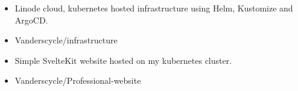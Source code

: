 \documentclass[10pt,a4paper,ragged2e,withhyper]{altacv}
\begin{document}
\begin{paracol}{2}

\begin{itemize}
\item Linode cloud, kubernetes hosted infrastructure using Helm, Kustomize and
  ArgoCD.
\item \faGithub Vanderscycle/infrastructure
\end{itemize}

\begin{itemize}
\item Simple SvelteKit website hosted on my kubernetes cluster.
\item \faGithub Vanderscycle/Professional-website
\end{itemize}
\end{paracol}
\end{document}
